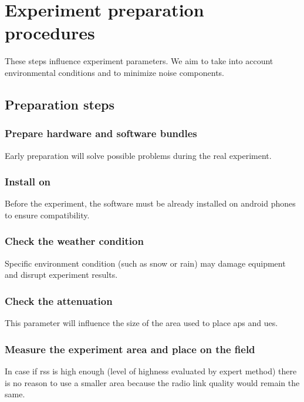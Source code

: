 \section{Experiment preparation procedures}\label{experiment-preparation-procedures}

These steps influence experiment parameters. We aim to take into account
environmental conditions and to minimize noise components.


\subsection{Preparation steps}\label{steps}

\subsubsection{Prepare hardware and software bundles}

Early preparation will solve possible problems during the real experiment.

\subsubsection{Install  on }

Before the experiment, the software must be already installed on \gls{android} phones to ensure compatibility.

\subsubsection{Check the weather condition}

Specific environment condition (such as snow or rain) may damage equipment
and disrupt experiment results.

\subsubsection{Check the  attenuation}

This parameter will influence the size of the area used to place \glspl{ap} and \glspl{ue}.


\subsubsection{Measure the experiment area and place  on the field}

In case if \acrshort{rss} is high enough (level of highness evaluated by expert method) there is no reason to use a smaller area
because the radio link quality would remain the same.